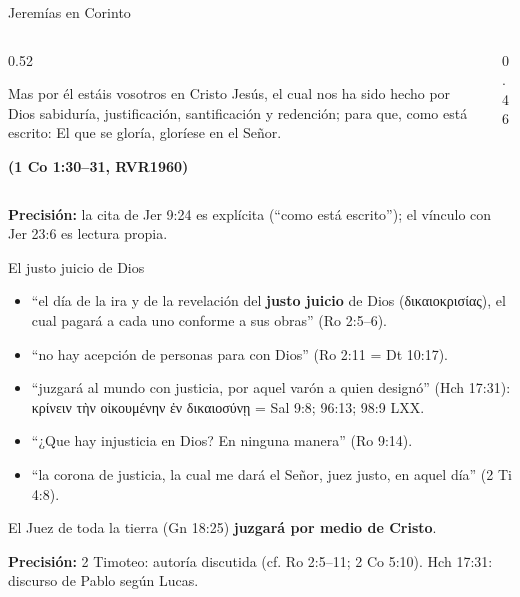 \documentclass[hyperref={bookmarks=false},aspectratio=169]{beamer}
\newcommand{\grc}[1]{\foreignlanguage{ancientgreek}{#1}}
\newcommand{\SENOR}{S{\fontsize{0.78em}{1em}\selectfont EÑOR}}
\newcommand{\fuente}[1]{\par\hfill{\upshape\bfseries\footnotesize\textcolor{azul}{#1}}}
\newcommand{\destacar}[1]{\textbf{\textcolor{azul}{#1}}}
\newcommand{\precision}[1]{{\footnotesize\color{gris}\textbf{Precisión:} #1}}
\begin{document}
\begin{frame}{Jeremías en Corinto}
\begin{columns}[c,onlytextwidth]
\begin{column}{0.52\textwidth}
\begin{cita}Mas por él estáis vosotros en Cristo Jesús, el cual nos ha sido hecho por Dios sabiduría, justificación, santificación y redención; para que, como está escrito: El que se gloría, gloríese en el Señor.\fuente{(1 Co 1:30--31, RVR1960)}\end{cita}
\end{column}
\begin{column}{0.46\textwidth}
\centering
{}
\end{column}
\end{columns}\par\smallskip
\precision{la cita de Jer 9:24 es explícita (``como está escrito''); el vínculo con Jer 23:6 es lectura propia.}
\end{frame}

\begin{frame}{El justo juicio de Dios}
\small
\begin{itemize}
\item ``el día de la ira y de la revelación del \destacar{justo juicio} de Dios (\grc{δικαιοκρισίας}), el cual pagará a cada uno conforme a sus obras'' (Ro 2:5--6).
\item ``no hay acepción de personas para con Dios'' (Ro 2:11 = Dt 10:17).
\item ``juzgará al mundo con justicia, por aquel varón a quien designó'' (Hch 17:31): \grc{κρίνειν τὴν οἰκουμένην ἐν δικαιοσύνῃ} = Sal 9:8; 96:13; 98:9 LXX.
\item ``¿Que hay injusticia en Dios? En ninguna manera'' (Ro 9:14).
\item ``la corona de justicia, la cual me dará el Señor, juez justo, en aquel día'' (2 Ti 4:8).
\end{itemize}
\begin{tcolorbox}[colback=papiro,colframe=dorado,boxrule=1pt,arc=3pt]
\small El Juez de toda la tierra (Gn 18:25) \destacar{juzgará por medio de Cristo}.
\end{tcolorbox}
\precision{2 Timoteo: autoría discutida (cf. Ro 2:5--11; 2 Co 5:10). Hch 17:31: discurso de Pablo según Lucas.}
\end{frame}
\end{document}
